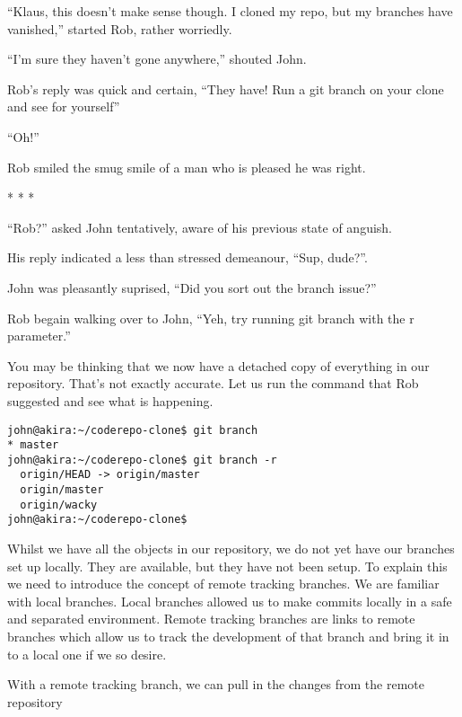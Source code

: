 \begin{trenches}
``Klaus, this doesn't make sense though.  I cloned my repo, but my branches have vanished,'' started Rob, rather worriedly.

``I'm sure they haven't gone anywhere,'' shouted John.  

Rob's reply was quick and certain, ``They have!  Run a git branch on your clone and see for yourself''

``Oh!''

Rob smiled the smug smile of a man who is pleased he was right.

\begin{center} * * * \end{center}

``Rob?'' asked John tentatively, aware of his previous state of anguish.

His reply indicated a less than stressed demeanour, ``Sup, dude?''.

John was pleasantly suprised, ``Did you sort out the branch issue?''

Rob begain walking over to John, ``Yeh, try running git branch with the r parameter.''

\end{trenches}

You may be thinking that we now have a detached copy of everything in our repository.  That's not exactly accurate.  Let us run the command that Rob suggested and see what is happening.  

\begin{Verbatim}[frame=leftline,framerule=1mm,fontsize=\relsize{-3}] 
john@akira:~/coderepo-clone$ git branch
* master
john@akira:~/coderepo-clone$ git branch -r
  origin/HEAD -> origin/master
  origin/master
  origin/wacky
john@akira:~/coderepo-clone$ 
\end{Verbatim}

Whilst we have all the objects in our repository, we do not yet have our branches set up locally.  They are available, but they have not been setup.  To explain this we need to introduce the concept of remote tracking branches.  We are familiar with local branches.  Local branches allowed us to make commits locally in a safe and separated environment.  Remote tracking branches are links to remote branches which allow us to track the development of that branch and bring it in to a local one if we so desire.

With a remote tracking branch, we can pull in the changes from the remote repository

